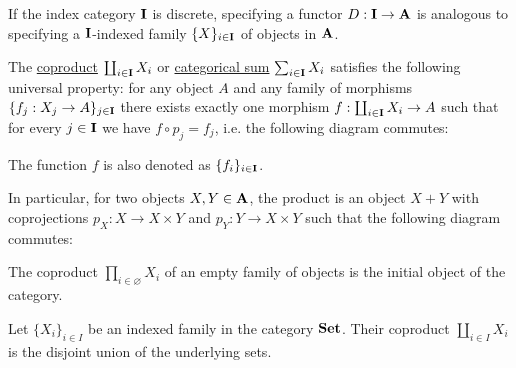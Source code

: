 \begin{definition}\label{def:categorical_coproduct}\cite[definition 5.2.2]{Leinster2014}
  If the index category $\operatorname{\mathbf{I}}$ is discrete, specifying a functor $D: \operatorname{\mathbf{I}} \to \operatorname{\mathbf{A}}$ is analogous to specifying a $\operatorname{\mathbf{I}}$-indexed family $\{ X \}_{i \in \operatorname{\mathbf{I}}}$ of objects in $\operatorname{\mathbf{A}}$.

  The \uline{coproduct} $\coprod_{i \in \operatorname{\mathbf{I}}} X_i$ or \uline{categorical sum} $\sum_{i \in \operatorname{\mathbf{I}}} X_i$ satisfies the following universal property: for any object $A$ and any family of morphisms $\{ f_j: {X_j} \to A \}_{j \in \operatorname{\mathbf{I}}}$ there exists exactly one morphism $f: \coprod_{i \in \operatorname{\mathbf{I}}} X_i \to A$ such that for every $j \in \operatorname{\mathbf{I}}$ we have $f \circ p_j = f_j$, i.e. the following diagram commutes:
  \begin{center}
  \end{center}

  The function $f$ is also denoted as $\{ f_i \}_{i \in \operatorname{\mathbf{I}}}$.

  In particular, for two objects $X, Y \in \operatorname{\mathbf{A}}$, the product is an object $X + Y$ with coprojections $p_X: X \to X \times Y$ and $p_Y: Y \to X \times Y$ such that the following diagram commutes:
  \begin{center}
  \end{center}
\end{definition}

\begin{note}\label{note:empty_categorical_coproduct}
  The coproduct $\prod_{i \in \varnothing} X_i$ of an empty family of objects is the initial object of the category.
\end{note}

\begin{example}\label{ex:categorical_coproduct/set}
  Let $\{ X_i \}_{i \in I}$ be an indexed family in the category $\operatorname{\mathbf{Set}}$. Their coproduct $\coprod_{i \in I} X_i$ is the disjoint union of the underlying sets.
\end{example}

